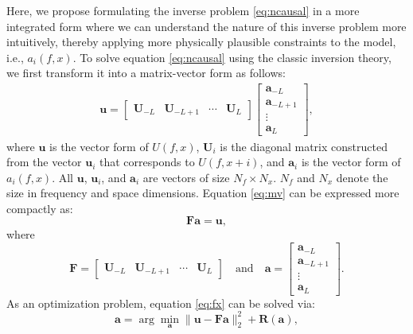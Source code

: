 Here, we propose formulating the inverse problem  \ref{eq:ncausal} in a more integrated form where we can understand the nature of this inverse problem more intuitively, thereby applying more physically plausible constraints to the model, i.e., $a_i(f,x)$. To solve equation \ref{eq:ncausal} using the classic inversion theory, we first transform it into a matrix-vector form as follows:
\begin{align}
\label{eq:mv}
\mathbf{u} = \left[\begin{array}{cccc}
\mathbf{U}_{-L} &\mathbf{U}_{-L+1}&\cdots&\mathbf{U}_{L}
\end{array}\right]\left[\begin{array}{c}
\mathbf{a}_{-L}\\
\mathbf{a}_{-L+1}\\
\vdots\\
\mathbf{a}_L
\end{array}\right],
\end{align}
where $\mathbf{u}$ is the vector form of $U(f,x)$, $\mathbf{U}_i$ is the diagonal matrix constructed from the vector $\mathbf{u}_i$ that corresponds to $U(f,x+i)$, and $\mathbf{a}_i$ is the vector form of $a_i(f,x)$.  All $\mathbf{u}$, $\mathbf{u}_i$, and $\mathbf{a}_i$ are vectors of size $N_f\times N_x$. $N_f$ and $N_x$ denote the size in frequency and space dimensions. Equation \ref{eq:mv} can be expressed more compactly as:
\begin{equation}
\label{eq:fx}
\mathbf{Fa}=\mathbf{u},
\end{equation}
where
\begin{equation}
\label{eq:fx2}
\mathbf{F}=\left[\begin{array}{cccc}
\mathbf{U}_{-L} &\mathbf{U}_{-L+1}&\cdots&\mathbf{U}_{L}
\end{array}\right] \quad \text{and}\quad \mathbf{a}=\left[\begin{array}{c}
\mathbf{a}_{-L}\\
\mathbf{a}_{-L+1}\\
\vdots\\
\mathbf{a}_L
\end{array}\right].
\end{equation}
As an optimization problem, equation \ref{eq:fx} can be solved via:
\begin{equation}
\label{eq:fx3}
\hat{\mathbf{a}} = \arg\min_{\mathbf{a}} \parallel \mathbf{u}-\mathbf{Fa} \parallel_2^2 + \mathbf{R}(\mathbf{a}),
\end{equation}
